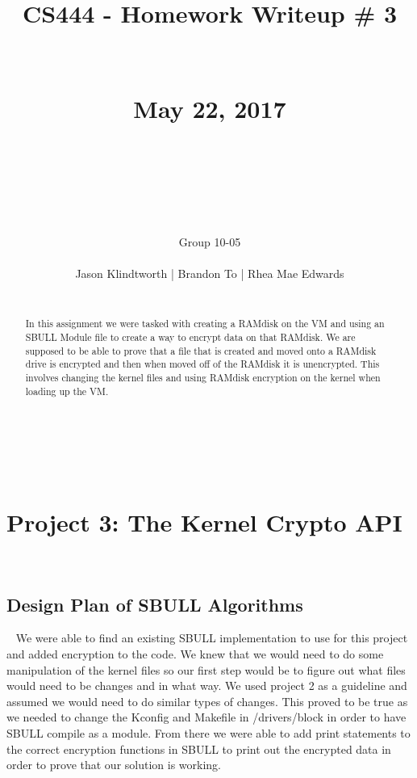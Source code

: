 \documentclass[10pt,journal,onecolumn,compsoc]{IEEEtran}
\title{CS444 - Homework Writeup \# 3 \\ ~ \\ ~ \\ May 22, 2017 \\ ~ \\ ~ \\ ~ \\}
\author{\huge Group 10-05\\ ~ \\Jason Klindtworth | Brandon To | Rhea Mae Edwards\\ ~ \\}
\begin{document}
\maketitle
~ \\ ~

\begin{abstract}

\noindent

In this assignment we were tasked with creating a RAMdisk on the VM and using an SBULL Module file to create a way to encrypt data on that RAMdisk. We are supposed to be able to prove that a file that is created and moved onto a RAMdisk drive is encrypted and then when moved off of the RAMdisk it is unencrypted. This involves changing the kernel files and using RAMdisk encryption on the kernel when loading up the VM.

\end{abstract}

\newpage
{}

\section*{\textbf{Project 3: The Kernel Crypto API}} ~

\subsection{\textbf{Design Plan of SBULL Algorithms}}~
We were able to find an existing SBULL implementation to use for this project and added encryption to the code. We knew that we would need to do some manipulation of the kernel files so our first step would be to figure out what files would need to be changes and in what way. We used project 2 as a guideline and assumed we would need to do similar types of changes. This proved to be true as we needed to change the Kconfig and Makefile in /drivers/block in order to have SBULL compile as a module. From there we were able to add print statements to the correct encryption functions in SBULL to print out the encrypted data in order to prove that our solution is working.\par
\end{document}
